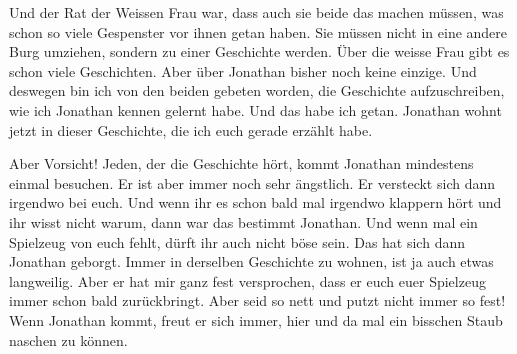 \medskip
\begin{mdframed}[style=mystyle]
Und der Rat der Weissen Frau war, dass auch sie beide das machen müssen, was schon so viele Gespenster vor ihnen getan haben. Sie müssen nicht in eine andere Burg umziehen, sondern zu einer Geschichte werden. Über die weisse Frau gibt es schon viele Geschichten. Aber über Jonathan bisher noch keine einzige. Und deswegen bin ich von den beiden gebeten worden, die Geschichte aufzuschreiben, wie ich Jonathan kennen gelernt habe. Und das habe ich getan. Jonathan wohnt jetzt in dieser Geschichte, die ich euch gerade erzählt habe. 

Aber Vorsicht! Jeden, der die Geschichte hört, kommt Jonathan mindestens einmal besuchen. Er ist aber immer noch sehr ängstlich. Er versteckt sich dann irgendwo bei euch. Und wenn ihr es schon bald mal irgendwo klappern hört und ihr wisst nicht warum, dann war das bestimmt Jonathan. Und wenn mal ein Spielzeug von euch fehlt, dürft ihr auch nicht böse sein. Das hat sich dann Jonathan geborgt. Immer in derselben Geschichte zu wohnen, ist ja auch etwas langweilig. Aber er hat mir ganz fest versprochen, dass er euch euer Spielzeug immer schon bald zurückbringt. Aber seid so nett und putzt nicht immer so fest! Wenn Jonathan kommt, freut er sich immer, hier und da mal ein bisschen Staub naschen zu können. \hfill {\color{red}\decofourleft}
\end{mdframed}\medskip

